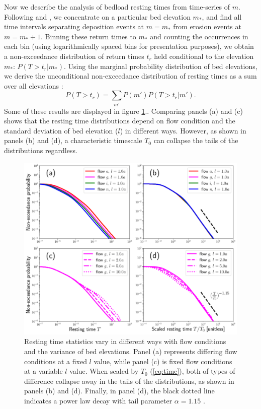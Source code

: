 \documentclass[draft]{agujournal2018}
\newcommand\be{\begin{equation}} %
\newcommand\ee{\end{equation}}   %
\begin{document}
Now we describe the analysis of bedload resting times from time-series of $m$.
Following \citet{Voepel2013} and \citet{Martin2014}, we concentrate on a particular bed elevation $m_\ast$, and find all time intervals separating deposition events at $m=m_\ast$ from erosion events at $m=m_\ast+1$.
Binning these return times to $m_\ast$ and counting the occurrences in each bin (using logarithmically spaced bins for presentation purposes), we obtain a non-exceedance distribution of return times $t_r$ held conditional to the elevation $m_\ast$: $P(T>t_r|m_\ast)$.
Using the marginal probability distribution of bed elevations, we derive the unconditional non-exceedance distribution of resting times as a sum over all elevations \citep{Yang1971, Nakagawa1980, Voepel2013, Martin2014}:
\be P(T>t_r) = \sum_{m'} P(m') P(T>t_r|m') .\ee
Some of these results are displayed in figure \ref{fig:cdfs}..
Comparing panels (a) and (c) shows that the resting time distributions depend on flow condition and the standard deviation of bed elevation ($l$) in different ways.
However, as shown in panels (b) and (d), a characteristic timescale $T_0$ can collapse the tails of the distributions regardless.
\begin{figure}[t!]
	\includegraphics[width=\linewidth,keepaspectratio]{./figures/montage1.pdf}
	\caption{Resting time statistics vary in different ways with flow conditions and the variance of bed elevations. Panel (a) represents differing flow conditions at a fixed $l$ value, while panel (c) is fixed flow conditions at a variable $l$ value. When scaled by $T_0$ (\ref{eq:time}), both of types of difference collapse away in the tails of the distributions, as shown in panels (b) and (d). Finally, in panel (d), the black dotted line indicates a power law decay with tail parameter $\alpha=1.15$ .}
	\label{fig:cdfs}
\end{figure}
\end{document}

